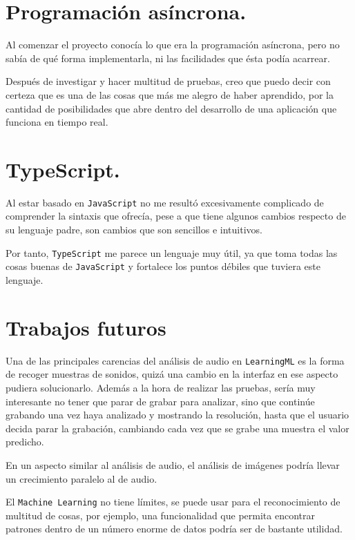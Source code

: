 \documentclass[a4paper, 12pt]{book}
\begin{document}
\section*{Programación asíncrona.}

Al comenzar el proyecto conocía lo que era la programación asíncrona, pero no sabía de qué forma implementarla, ni las facilidades que ésta podía acarrear.

Después de investigar y hacer multitud de pruebas, creo que puedo decir con certeza que es una de las cosas que más me alegro de haber aprendido, por la cantidad de posibilidades que abre dentro del desarrollo de una aplicación que funciona en tiempo real.

\section*{TypeScript.}

Al estar basado en \texttt{JavaScript} no me resultó excesivamente complicado de comprender la sintaxis que ofrecía, pese a que tiene algunos cambios respecto de su lenguaje padre, son cambios que son sencillos e intuitivos.

Por tanto, \texttt{TypeScript} me parece un lenguaje muy útil, ya que toma todas las cosas buenas de \texttt{JavaScript} y fortalece los puntos débiles que tuviera este lenguaje.

\section{Trabajos futuros}
\label{sec:trabajos_futuros}

Una de las principales carencias del análisis de audio en \texttt{LearningML} es la forma de recoger muestras de sonidos, quizá una cambio en la interfaz en ese aspecto pudiera solucionarlo. Además a la hora de realizar las pruebas, sería muy interesante no tener que parar de grabar para analizar, sino que continúe grabando una vez haya analizado y mostrando la resolución, hasta que el usuario decida parar la grabación, cambiando cada vez que se grabe una muestra el valor predicho.

En un aspecto similar al análisis de audio, el análisis de imágenes podría llevar un crecimiento paralelo al de audio.

El \texttt{Machine Learning} no tiene límites, se puede usar para el reconocimiento de multitud de cosas, por ejemplo, una funcionalidad que permita encontrar patrones dentro de un número enorme de datos podría ser de bastante utilidad.
\end{document}

